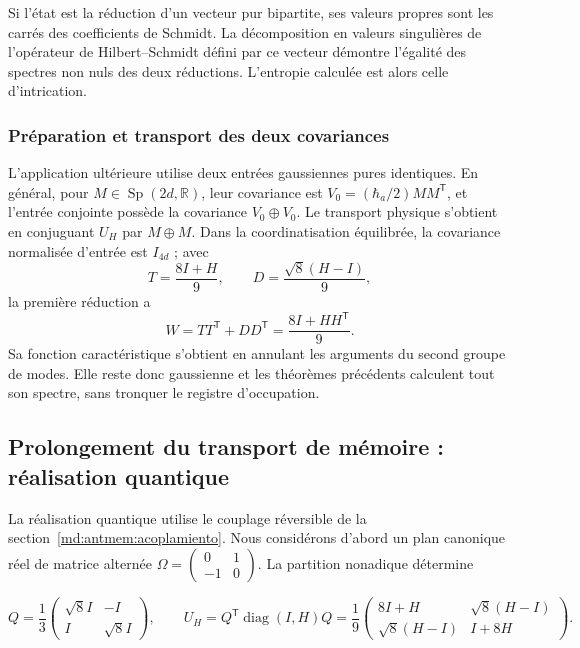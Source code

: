 Si l’état est la réduction d’un vecteur pur bipartite, ses
valeurs propres sont les carrés des coefficients de Schmidt.
La décomposition en valeurs singulières de l’opérateur de Hilbert--Schmidt défini
par ce vecteur démontre l’égalité des spectres non nuls des deux
réductions. L’entropie calculée est alors celle d’intrication.

\subsubsection{Préparation et transport des deux covariances}
L’application ultérieure utilise deux entrées gaussiennes pures identiques.
En général, pour \(M\in\operatorname{Sp}(2d,\mathbb R)\), leur covariance est
\(V_0=(\hbar_a/2)MM^{\mathsf T}\), et l’entrée conjointe possède la
covariance \(V_0\oplus V_0\). Le transport physique s’obtient
en conjuguant \(U_H\) par \(M\oplus M\). Dans la coordinatisation équilibrée,
la covariance normalisée d’entrée est \(I_{4d}\) ; avec
\[
 T=\frac{8I+H}{9},\qquad D=\frac{\sqrt8(H-I)}9,
\]
la première réduction a
\[
 W=TT^{\mathsf T}+DD^{\mathsf T}=\frac{8I+HH^{\mathsf T}}9.
\]
Sa fonction caractéristique s’obtient en annulant les arguments du
second groupe de modes. Elle reste donc gaussienne et les théorèmes
précédents calculent tout son spectre, sans tronquer le registre d’occupation.

\subsection{Prolongement du transport de mémoire : réalisation quantique}

La réalisation quantique utilise le couplage réversible de la section~\ref{md:antmem:acoplamiento}. Nous considérons d’abord un plan canonique réel de matrice alternée \(\Omega=\left(\begin{smallmatrix}0&1\\-1&0\end{smallmatrix}\right)\). La partition nonadique détermine

\begin{equation}
Q=\frac13\begin{pmatrix}\sqrt8 I&-I\\I&\sqrt8 I\end{pmatrix},\qquad
U_H=Q^{\mathsf T}\operatorname{diag}(I,H)Q
=\frac19\begin{pmatrix}8I+H&\sqrt8(H-I)\\
\sqrt8(H-I)&I+8H\end{pmatrix}.
\label{md:antmem:cuantica:eq:5.1}
\end{equation}


